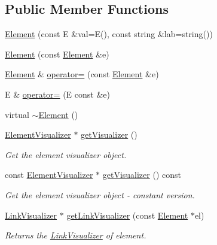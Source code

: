  \subsection*{Public Member Functions}
\begin{DoxyCompactItemize}
\item 
\hyperlink{classbridges_1_1datastructure_1_1_element_a21820b1d88f2eb25adfe768bd03046d6}{Element} (const E \&val=E(), const string \&lab=string())
\item 
\hyperlink{classbridges_1_1datastructure_1_1_element_a80eb6ac6925c4974c2e88e7e1446e231}{Element} (const \hyperlink{classbridges_1_1datastructure_1_1_element}{Element} \&e)
\item 
\hyperlink{classbridges_1_1datastructure_1_1_element}{Element} \& \hyperlink{classbridges_1_1datastructure_1_1_element_a6446ad27ba42a854ff93b74b4d7eb3cb}{operator=} (const \hyperlink{classbridges_1_1datastructure_1_1_element}{Element} \&e)
\item 
E \& \hyperlink{classbridges_1_1datastructure_1_1_element_a18ffc753328275e95bb1ee967f88a00a}{operator=} (E const \&e)
\item 
virtual \hyperlink{classbridges_1_1datastructure_1_1_element_ad7ed60da8ed4a31b7a2678d0aa5db205}{$\sim$\+Element} ()
\item 
\hyperlink{classbridges_1_1datastructure_1_1_element_visualizer}{Element\+Visualizer} $\ast$ \hyperlink{classbridges_1_1datastructure_1_1_element_ad4f9ca479938bacd4586df8e7ede2116}{get\+Visualizer} ()
\begin{DoxyCompactList}\small\item\em Get the element visualizer object. \end{DoxyCompactList}\item 
const \hyperlink{classbridges_1_1datastructure_1_1_element_visualizer}{Element\+Visualizer} $\ast$ \hyperlink{classbridges_1_1datastructure_1_1_element_a75a7770c3b6b1a6cd826293ea33d2d0a}{get\+Visualizer} () const
\begin{DoxyCompactList}\small\item\em Get the element visualizer object -\/ constant version. \end{DoxyCompactList}\item 
\hyperlink{classbridges_1_1datastructure_1_1_link_visualizer}{Link\+Visualizer} $\ast$ \hyperlink{classbridges_1_1datastructure_1_1_element_a531bde8ec32ef31b6d88af37cb029d86}{get\+Link\+Visualizer} (const \hyperlink{classbridges_1_1datastructure_1_1_element}{Element} $\ast$el)
\begin{DoxyCompactList}\small\item\em Returns the \hyperlink{classbridges_1_1datastructure_1_1_link_visualizer}{Link\+Visualizer} of element. \end{DoxyCompactList}\item 

\end{DoxyCompactItemize}
